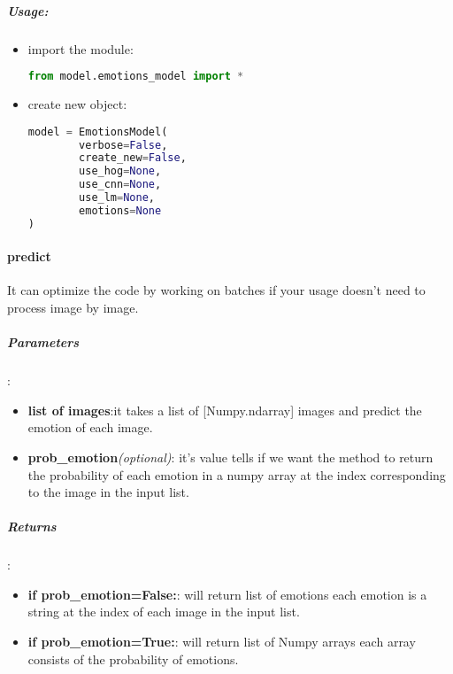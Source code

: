 \subparagraph{Usage:}
\begin{changemargin}{0.5cm}{0cm}
\begin{itemize}
\item import the module:
\begin{lstlisting}[language=Python]
from model.emotions_model import *\end{lstlisting}

\item create new object:
\begin{lstlisting}[language=Python]
model = EmotionsModel(
		verbose=False,
		create_new=False,
		use_hog=None,
		use_cnn=None,
		use_lm=None,
		emotions=None
)\end{lstlisting}

\end{itemize}
\end{changemargin}

\paragraph{predict}It can optimize the code by working on batches if your usage doesn't need to process image by image.

\subparagraph{Parameters}:
\begin{changemargin}{0.5cm}{0cm}
\begin{itemize}
	\item \textbf{list of images}:it takes a list of [Numpy.ndarray] images and predict the emotion of each image.
	\item \textbf{prob\_emotion}\textit{(optional)}: it's value tells if we want the method to return the probability of each emotion in a numpy array at the index corresponding to the image in the input list. 
\end{itemize}
\end{changemargin}

\subparagraph{Returns}:
\begin{changemargin}{0.5cm}{0cm}
\begin{itemize}[nolistsep]
	\item \textbf{if prob\_emotion=False:}:\newline
	will return list of emotions each emotion is a string at the index of each image in the input list.
	\item \textbf{if prob\_emotion=True:}:\newline
	will return list of Numpy arrays each array consists of the probability of emotions.
\end{itemize}
\end{changemargin}



